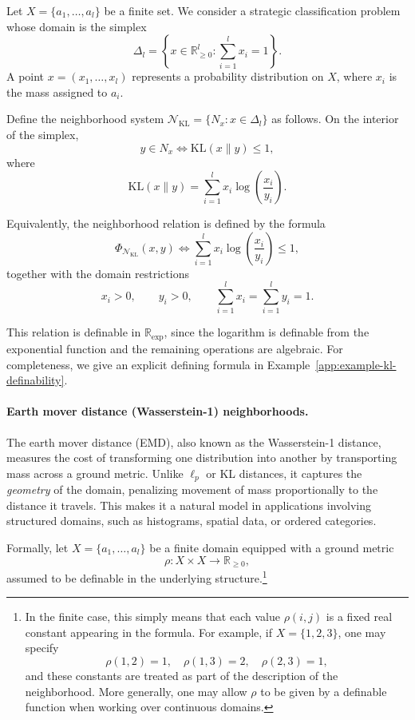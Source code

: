 \documentclass[11pt]{article}
\theoremstyle{plain}
\theoremstyle{definition}
\theoremstyle{remark}
\newcommand{\R}{\mathbb{R}}
\begin{document}
Let \(X=\{a_1,\ldots,a_l\}\) be a finite set. We consider a strategic
classification problem whose domain is the simplex
\[
  \Delta_l
  =
  \left\{
    x\in \R_{\ge 0}^l : \sum_{i=1}^l x_i=1
  \right\}.
\]
A point \(x=(x_1,\ldots,x_l)\) represents a probability distribution on \(X\),
where \(x_i\) is the mass assigned to \(a_i\).

Define the neighborhood system
\(\mathcal N_{\mathrm{KL}}=\{N_x:x\in\Delta_l\}\) as follows.
On the interior of the simplex,
\[
  y\in N_x
  \iff
  \mathrm{KL}(x\|y)\le 1,
\]
where
\[
  \mathrm{KL}(x\|y)
  =
  \sum_{i=1}^l
  x_i\log\left(\frac{x_i}{y_i}\right).
\]

Equivalently, the neighborhood relation is defined by the formula
\[
  \Phi_{\mathcal N_{\mathrm{KL}}}(x,y)
  \iff
  \sum_{i=1}^l
  x_i\log\left(\frac{x_i}{y_i}\right)
  \le 1,
\]
together with the domain restrictions
\[
  x_i>0,\qquad y_i>0,\qquad
  \sum_{i=1}^l x_i=\sum_{i=1}^l y_i=1.
\]

This relation is definable in \(\R_{\exp}\), since the logarithm is definable
from the exponential function and the remaining operations are algebraic. For
completeness, we give an explicit defining formula in
Example~\ref{app:example-kl-definability}.

\paragraph{Earth mover distance (Wasserstein-1) neighborhoods.}

The earth mover distance (EMD), also known as the Wasserstein-1 distance,
measures the cost of transforming one distribution into another by transporting
mass across a ground metric. Unlike \(\ell_p\) or KL distances, it captures the
\emph{geometry} of the domain, penalizing movement of mass proportionally to
the distance it travels. This makes it a natural model in applications
involving structured domains, such as histograms, spatial data, or ordered
categories.

Formally, let \(X=\{a_1,\dots,a_l\}\) be a finite domain equipped with a ground
metric
\[
  \rho\colon X\times X\to\R_{\ge 0},
\]
assumed to be definable in the underlying structure.\footnote{
In the finite case, this simply means that each value \(\rho(i,j)\) is a fixed
real constant appearing in the formula. For example, if \(X=\{1,2,3\}\), one may
specify
\[
  \rho(1,2)=1,\quad \rho(1,3)=2,\quad \rho(2,3)=1,
\]
and these constants are treated as part of the description of the neighborhood.
More generally, one may allow \(\rho\) to be given by a definable function when
working over continuous domains.
}
\end{document}
